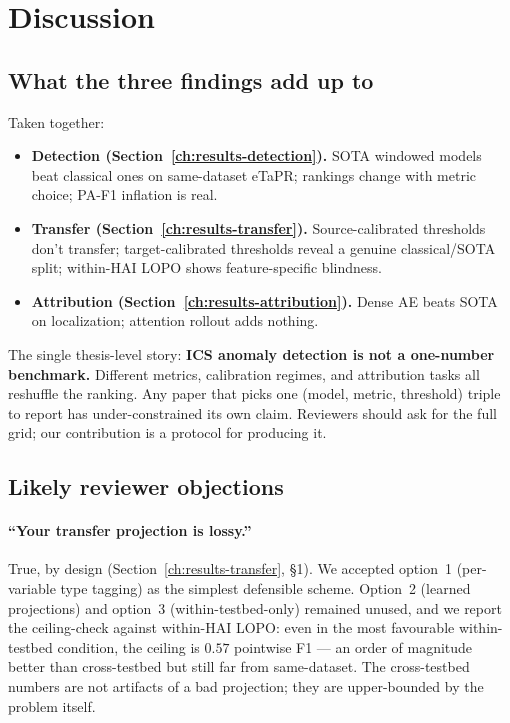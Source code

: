 \section{Discussion}
\label{ch:discussion}

\subsection{What the three findings add up to}

Taken together:
\begin{itemize}
  \item \textbf{Detection (Section~\ref{ch:results-detection}).}  SOTA windowed models beat classical ones on same-dataset eTaPR; rankings change with metric choice; PA-F1 inflation is real.
  \item \textbf{Transfer (Section~\ref{ch:results-transfer}).}  Source-calibrated thresholds don't transfer; target-calibrated thresholds reveal a genuine classical/SOTA split; within-HAI LOPO shows feature-specific blindness.
  \item \textbf{Attribution (Section~\ref{ch:results-attribution}).}  Dense AE beats SOTA on localization; attention rollout adds nothing.
\end{itemize}

The single thesis-level story: \textbf{ICS anomaly detection is not a one-number benchmark.}  Different metrics, calibration regimes, and attribution tasks all reshuffle the ranking.  Any paper that picks one (model, metric, threshold) triple to report has under-constrained its own claim.  Reviewers should ask for the full grid; our contribution is a protocol for producing it.

\subsection{Likely reviewer objections}

\paragraph{``Your transfer projection is lossy.''}
True, by design (Section~\ref{ch:results-transfer}, \S1).  We accepted option~1 (per-variable type tagging) as the simplest defensible scheme.  Option~2 (learned projections) and option~3 (within-testbed-only) remained unused, and we report the ceiling-check against within-HAI LOPO: even in the most favourable within-testbed condition, the ceiling is $0.57$ pointwise F1 --- an order of magnitude better than cross-testbed but still far from same-dataset.  The cross-testbed numbers are not artifacts of a bad projection; they are upper-bounded by the problem itself.

